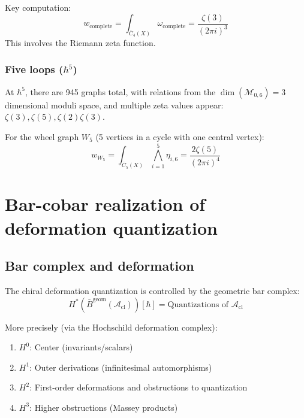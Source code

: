Key computation:
\[w_{\text{complete}} = \int_{\overline{C}_4(X)} \omega_{\text{complete}} = \frac{\zeta(3)}{(2\pi i)^3}\]
This involves the Riemann zeta function.

\subsubsection{\texorpdfstring{Five loops ($\hbar^5$)}{Five loops (5)}}

At $\hbar^5$, there are 945 graphs total, with relations from the $\dim(\mathcal{M}_{0,6}) = 3$ dimensional moduli space, and multiple zeta values appear: $\zeta(3), \zeta(5), \zeta(2)\zeta(3)$.

\begin{example}
For the wheel graph $W_5$ (5 vertices in a cycle with one central vertex):
\[w_{W_5} = \int_{\overline{C}_5(X)} \bigwedge_{i=1}^5 \eta_{i,6} = \frac{2\zeta(5)}{(2\pi i)^4}\]
\end{example}

\section{Bar-cobar realization of deformation quantization}

\subsection{Bar complex and deformation}

\begin{theorem}
\label{thm:bar-computes-deformation}
The chiral deformation quantization is controlled by the geometric bar complex:
\[H^*(\bar{B}^{\text{geom}}(\mathcal{A}_{\text{cl}}))[\hbar] = \text{Quantizations of } \mathcal{A}_{\text{cl}}\]

More precisely (via the Hochschild deformation complex):
\begin{enumerate}
\item $H^0$: Center (invariants/scalars)
\item $H^1$: Outer derivations (infinitesimal automorphisms)
\item $H^2$: First-order deformations and obstructions to quantization
\item $H^3$: Higher obstructions (Massey products)
\end{enumerate}
\end{theorem}

